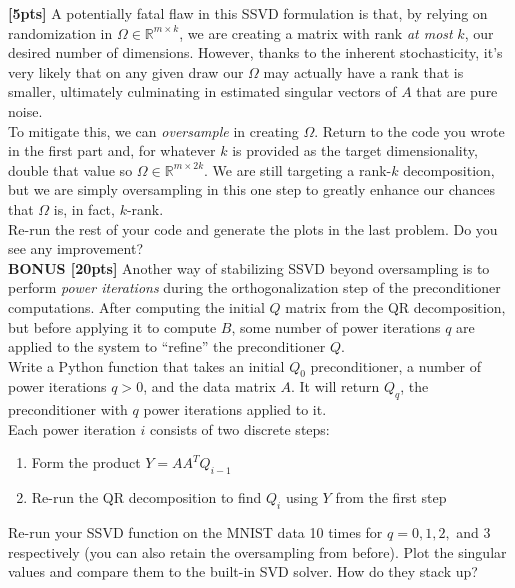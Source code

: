 \documentclass[paper=a4, fontsize=11pt]{scrartcl} %
\numberwithin{figure}{section} %
\numberwithin{table}{section} %
\begin{document}
\textbf{[5pts]} A potentially fatal flaw in this SSVD formulation is that, by relying on randomization in $\Omega \in \mathbb{R}^{m \times k}$, we are creating a matrix with rank \emph{at most} $k$, our desired number of dimensions. However, thanks to the inherent stochasticity, it's very likely that on any given draw our $\Omega$ may actually have a rank that is smaller, ultimately culminating in estimated singular vectors of $A$ that are pure noise. \\

To mitigate this, we can \emph{oversample} in creating $\Omega$. Return to the code you wrote in the first part and, for whatever $k$ is provided as the target dimensionality, double that value so $\Omega \in \mathbb{R}^{m \times 2k}$. We are still targeting a rank-$k$ decomposition, but we are simply oversampling in this one step to greatly enhance our chances that $\Omega$ is, in fact, $k$-rank. \\

Re-run the rest of your code and generate the plots in the last problem. Do you see any improvement? \\

\textbf{BONUS [20pts]} Another way of stabilizing SSVD beyond oversampling is to perform \emph{power iterations} during the orthogonalization step of the preconditioner computations. After computing the initial $Q$ matrix from the QR decomposition, but before applying it to compute $B$, some number of power iterations $q$ are applied to the system to ``refine'' the preconditioner $Q$. \\

Write a Python function that takes an initial $Q_0$ preconditioner, a number of power iterations $q > 0$, and the data matrix $A$. It will return $Q_q$, the preconditioner with $q$ power iterations applied to it. \\

Each power iteration $i$ consists of two discrete steps:
\begin{enumerate}
	\item Form the product $Y = AA^TQ_{i - 1}$
	\item Re-run the QR decomposition to find $Q_i$ using $Y$ from the first step
\end{enumerate}

Re-run your SSVD function on the MNIST data 10 times for $q = 0, 1, 2,$ and 3 respectively (you can also retain the oversampling from before). Plot the singular values and compare them to the built-in SVD solver. How do they stack up? \\
\end{document}

